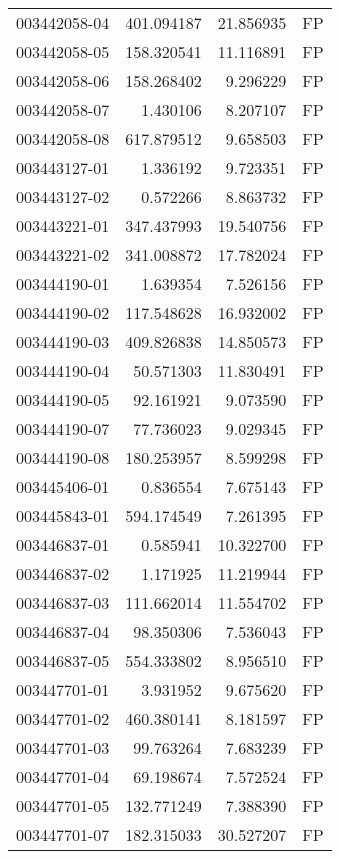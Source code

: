 \begin{tabular}{lrrl}
003442058-04 &  401.094187 &    21.856935 &   FP \\
003442058-05 &  158.320541 &    11.116891 &   FP \\
003442058-06 &  158.268402 &     9.296229 &   FP \\
003442058-07 &    1.430106 &     8.207107 &   FP \\
003442058-08 &  617.879512 &     9.658503 &   FP \\
003443127-01 &    1.336192 &     9.723351 &   FP \\
003443127-02 &    0.572266 &     8.863732 &   FP \\
003443221-01 &  347.437993 &    19.540756 &   FP \\
003443221-02 &  341.008872 &    17.782024 &   FP \\
003444190-01 &    1.639354 &     7.526156 &   FP \\
003444190-02 &  117.548628 &    16.932002 &   FP \\
003444190-03 &  409.826838 &    14.850573 &   FP \\
003444190-04 &   50.571303 &    11.830491 &   FP \\
003444190-05 &   92.161921 &     9.073590 &   FP \\
003444190-07 &   77.736023 &     9.029345 &   FP \\
003444190-08 &  180.253957 &     8.599298 &   FP \\
003445406-01 &    0.836554 &     7.675143 &   FP \\
003445843-01 &  594.174549 &     7.261395 &   FP \\
003446837-01 &    0.585941 &    10.322700 &   FP \\
003446837-02 &    1.171925 &    11.219944 &   FP \\
003446837-03 &  111.662014 &    11.554702 &   FP \\
003446837-04 &   98.350306 &     7.536043 &   FP \\
003446837-05 &  554.333802 &     8.956510 &   FP \\
003447701-01 &    3.931952 &     9.675620 &   FP \\
003447701-02 &  460.380141 &     8.181597 &   FP \\
003447701-03 &   99.763264 &     7.683239 &   FP \\
003447701-04 &   69.198674 &     7.572524 &   FP \\
003447701-05 &  132.771249 &     7.388390 &   FP \\
003447701-07 &  182.315033 &    30.527207 &   FP \\

\end{tabular}
